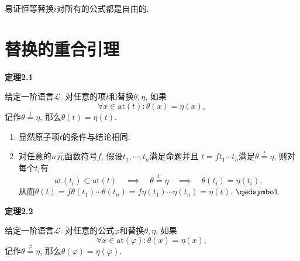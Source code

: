 \vspace{10pt}

易证恒等替换$i$对所有的公式都是自由的.





\newpage

\section{替换的重合引理}

\hypertarget{sec:定理2.1}{}
\noindent\textbf{定理2.1}

给定一阶语言$\mathcal{L}$. 对任意的项$t$和替换$\theta,\eta$, 如果
\[
    \forall x\in\mathrm{at}(t):\theta(x)=\eta(x),
\]
记作$\theta\overset{\displaystyle t}{=}\eta$, 那么$\theta(t)=\eta(t)$.


\begin{enumerate}
    \item 显然原子项$t$的条件与结论相同.
    \item 对任意的$n$元函数符号$f$, 假设$t_1,\cdots,t_n$满足命题并且
    $t=ft_1\cdots t_n$满足$\theta\overset{\displaystyle t}{=}\eta$,
    则对每个$t_i$有
    \[
        \mathrm{at}(t_i)\subset\mathrm{at}(t)\quad\implies\quad
        \theta\overset{\displaystyle t_i}{=}\eta\quad\implies\quad
        \theta(t_i)=\eta(t_i),
    \]
    从而$\theta(t)=f\theta(t_1)\cdots\theta(t_n)=f\eta(t_1)\cdots\eta(t_n)=\eta(t)$.
    \hfill $\qedsymbol$
\end{enumerate}

\vspace{10pt}

\hypertarget{sec:定理2.2}{}
\noindent\textbf{定理2.2}

给定一阶语言$\mathcal{L}$. 对任意的公式$\varphi$和替换$\theta,\eta$, 如果
\[
    \forall x\in\mathrm{at}(\varphi):\theta(x)=\eta(x),
\]
记作$\theta\overset{\displaystyle\varphi}{=}\eta$,
那么$\theta(\varphi)=\eta(\varphi)$.



